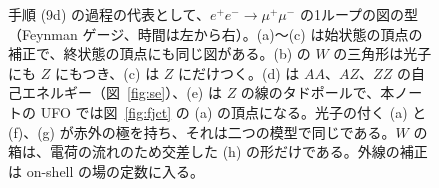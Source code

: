 \documentclass[a4paper,10pt]{ltjsarticle}
\begin{document}
\begin{figure}[tbp]
\caption{手順 (9d) の過程の代表として、$e^+e^-\to\mu^+\mu^-$ の1ループの図の型（Feynman ゲージ、時間は左から右）。(a)〜(c) は始状態の頂点の補正で、終状態の頂点にも同じ図がある。(b) の $W$ の三角形は光子にも $Z$ にもつき、(c) は $Z$ にだけつく。(d) は $AA$、$AZ$、$ZZ$ の自己エネルギー（図~\ref{fig:se}）、(e) は $Z$ の線のタドポールで、本ノートの UFO では図~\ref{fig:fjct} の (a) の頂点になる。光子の付く (a) と (f)、(g) が赤外の極を持ち、それは二つの模型で同じである。$W$ の箱は、電荷の流れのため交差した (h) の形だけである。外線の補正は on-shell の場の定数に入る。}
\label{fig:eemm}
\end{figure}
\end{document}
